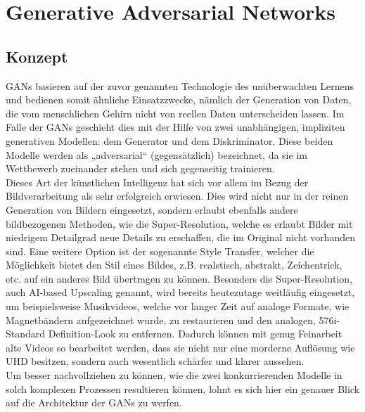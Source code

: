 \chapter{Generative Adversarial Networks}

\section{Konzept}

\noindent \acfp{GAN} basieren auf der zuvor genannten Technologie des unüberwachten Lernens und bedienen somit ähnliche Einsatzzwecke, nämlich der Generation von Daten, die vom menschlichen Gehirn nicht von reellen Daten unterscheiden lassen. Im Falle der \acp{GAN} geschieht dies mit der Hilfe von zwei unabhängigen, impliziten generativen Modellen: dem Generator und dem Diskriminator. Diese beiden Modelle werden als „adversarial“ (gegensätzlich) bezeichnet, da sie im Wettbewerb zueinander stehen und sich gegenseitig trainieren.  \\

\noindent Dieses Art der künstlichen Intelligenz hat sich vor allem im Bezug der Bildverarbeitung als sehr erfolgreich erwiesen. Dies wird nicht nur in der reinen Generation von Bildern eingesetzt, sondern erlaubt ebenfalls andere bildbezogenen Methoden, wie die Super-Resolution, welche es erlaubt Bilder mit niedrigem Detailgrad neue Details zu erschaffen, die im Original nicht vorhanden sind. Eine weitere Option ist der sogenannte Style Transfer, welcher die Möglichkeit bietet den Stil eines Bildes, z.B. realstisch, abstrakt, Zeichentrick, etc. auf ein anderes Bild übertragen zu können. Besonders die Super-Resolution, auch AI-based Upscaling genannt, wird bereits heutezutage weitläufig eingesetzt, um beispielsweise Musikvideos, welche vor langer Zeit auf analoge Formate, wie Magnetbändern aufgezeichnet wurde, zu restaurieren und den analogen, 576i-Standard Definition-Look zu entfernen. Dadurch können mit genug Feinarbeit alte Videos so bearbeitet werden, dass sie nicht nur eine morderne Auflösung wie UHD besitzen, sondern auch wesentlich schärfer und klarer aussehen. \\

\noindent Um besser nachvollziehen zu können, wie die zwei konkurrierenden Modelle in solch komplexen Prozessen resultieren können, lohnt es sich hier ein genauer Blick auf die Architektur der \acp{GAN} zu werfen.

\newpage